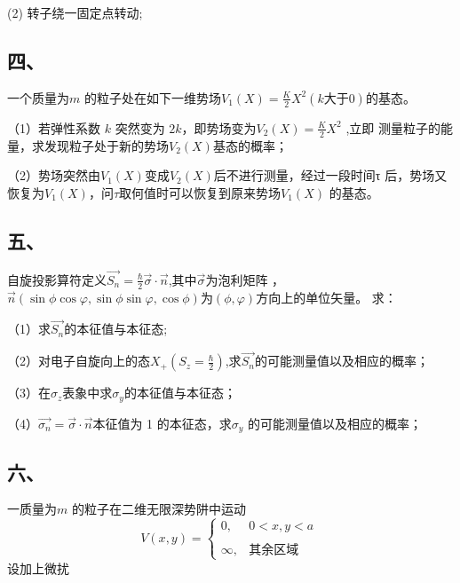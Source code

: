 (2) 转子绕一固定点转动;
\subsection{四、}
一个质量为$m$ 的粒子处在如下一维势场$V_1(X) = \frac{K}{2}X^2(k \text{大于} 0)$的基态。

（1）若弹性系数 $k$ 突然变为 $2k$，即势场变为$V_2(X) = \frac{K}{2}X^2$ ,立即
测量粒子的能量，求发现粒子处于新的势场$V_2(X)$基态的概率；

（2）势场突然由$V_1(X)$变成$V_2(X)$后不进行测量，经过一段时间τ
后，势场又恢复为$V_1(X)$，问$\tau$取何值时可以恢复到原来势场$V_1(X)$
的基态。
\subsection{五、}
自旋投影算符定义$\vec{S_n}=\frac{\hbar}{2}\vec{\sigma}\cdot \vec{n}$,其中$\vec{\sigma}$为泡利矩阵 ，$\vec{n}(\sin\phi\cos\varphi,\sin\phi\sin\varphi,\cos\phi)$为$(\phi,\varphi)$方向上的单位矢量。
求：

（1）求$\vec{S_n}$的本征值与本征态;

（2）对电子自旋向上的态$X_+(S_z=\frac{\hbar}{2})$,求$\vec{S_n}$的可能测量值以及相应的概率；

（3）在$\sigma_z$表象中求$\sigma_y$的本征值与本征态；

（4）$\vec{\sigma_n}=\vec{\sigma}\cdot\vec{n}$本征值为 1 的本征态，求$\sigma_y$ 的可能测量值以及相应的概率；
\subsection{六、}
一质量为$m$ 的粒子在二维无限深势阱中运动
$$V(x,y)=\begin{cases}
0,&0 < x, y < a\\\\
\infty ,& \text{其余区域}
\end{cases}~
$$
设加上微扰$$